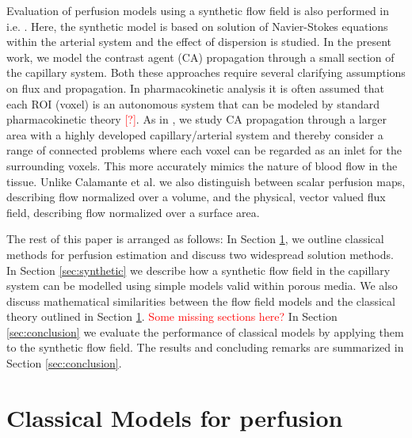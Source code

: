 \documentclass[paper=a4, fontsize=11pt,parskip=half,headings=small]{scrartcl}
\newcommand{\missingsource}{\textcolor{red}{[?]}}
\begin{document}
	Evaluation of perfusion models using a synthetic flow field is also performed in i.e. \cite{calamante03}. 
	Here, the synthetic model is based on solution of Navier-Stokes equations within the arterial system and the effect of dispersion is studied.  
	In the present work, we model the contrast agent (CA) propagation through a small section of the capillary system. 
	Both these approaches require several clarifying assumptions on flux and propagation. 
	In pharmacokinetic analysis it is often assumed that each ROI (voxel) is an autonomous system that can be modeled by standard pharmacokinetic theory \missingsource. 
	As in \cite{calamante03}, we study CA propagation through a larger area with a highly developed capillary/arterial system and thereby consider a range of connected problems where each voxel can be regarded as an inlet for the surrounding voxels.  
This more accurately mimics the nature of blood flow in the tissue.  
	Unlike Calamante et al. \cite{calamante03} we also distinguish between scalar perfusion maps, describing flow normalized over a volume, and the physical, vector valued flux field, describing flow normalized over a surface area. 


	The rest of this paper is arranged as follows: In Section \ref{sec:classical}, we outline classical methods for perfusion estimation and discuss two widespread solution methods. 
	In Section \ref{sec:synthetic} we describe how a synthetic flow field in the capillary system can be modelled using simple models valid within porous media. 
	We also discuss mathematical similarities between the flow field models and the classical theory outlined in Section \ref{sec:classical}. 
	\textcolor{red}{Some missing sections here?}
	In Section \ref{sec:conclusion} we evaluate the performance of classical models by applying them to the synthetic flow field. 
	The results and concluding remarks are summarized in Section \ref{sec:conclusion}.
	
	
	
	\section{Classical Models for perfusion} \label{sec:classical}
\end{document}
